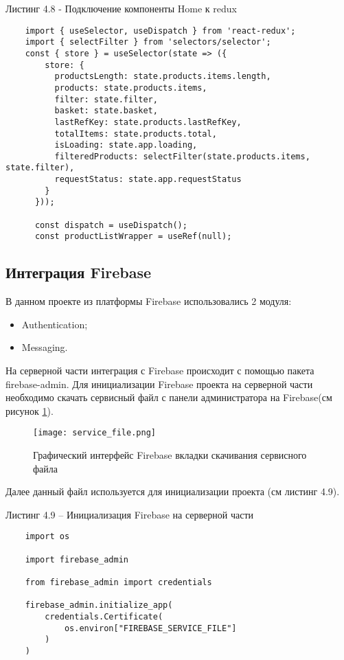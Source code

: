 Листинг 4.8 - Подключение компоненты Home к redux
\begin{lstlisting}
    import { useSelector, useDispatch } from 'react-redux';
    import { selectFilter } from 'selectors/selector';
    const { store } = useSelector(state => ({
        store: {
          productsLength: state.products.items.length,
          products: state.products.items,
          filter: state.filter,
          basket: state.basket,
          lastRefKey: state.products.lastRefKey,
          totalItems: state.products.total,
          isLoading: state.app.loading,
          filteredProducts: selectFilter(state.products.items, state.filter),
          requestStatus: state.app.requestStatus
        }
      }));

      const dispatch = useDispatch();
      const productListWrapper = useRef(null);

\end{lstlisting}


\subsection{Интеграция Firebase}
В данном проекте из платформы Firebase использовались 2 модуля:
\begin{itemize}
    \item Authentication;
    \item Messaging.
\end{itemize}

На серверной части интеграция с Firebase происходит с помощью пакета firebase-admin.
Для инициализации Firebase проекта на серверной части необходимо скачать сервисный файл с панели администратора на Firebase(см рисунок \ref{fire:admin}).

\begin{figure}[ht]
    \centering
    \texttt{[image: service\_file.png]}
    \caption{ Графический интерфейс Firebase вкладки скачивания сервисного файла }
    \label{fire:admin}
\end{figure}

Далее данный файл используется для инициализации проекта (см листинг 4.9).

Листинг 4.9 – Инициализация Firebase на серверной части
\begin{lstlisting}
    import os

    import firebase_admin

    from firebase_admin import credentials

    firebase_admin.initialize_app(
        credentials.Certificate(
            os.environ["FIREBASE_SERVICE_FILE"]
        )
    )
\end{lstlisting}

